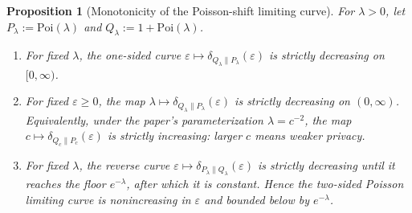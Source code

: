 \documentclass{article}
\newtheorem{proposition}[theorem]{Proposition}
\begin{document}
\begin{proposition}[Monotonicity of the Poisson-shift limiting curve]
\label{prop:poisson-monotonicity}
For $\lambda > 0$, let $P_\lambda := \mathrm{Poi}(\lambda)$ and $Q_\lambda := 1 + \mathrm{Poi}(\lambda)$.
\begin{enumerate}
\item[(i)] For fixed $\lambda$, the one-sided curve $\varepsilon \mapsto \delta_{Q_\lambda\|P_\lambda}(\varepsilon)$ is strictly decreasing on $[0, \infty)$.
\item[(ii)] For fixed $\varepsilon \geq 0$, the map $\lambda \mapsto \delta_{Q_\lambda\|P_\lambda}(\varepsilon)$ is strictly decreasing on $(0, \infty)$. Equivalently, under
the paper's parameterization $\lambda = c^{-2}$, the map $c \mapsto \delta_{Q_c\|P_c}(\varepsilon)$ is strictly increasing: larger $c$
means weaker privacy.
\item[(iii)] For fixed $\lambda$, the reverse curve $\varepsilon \mapsto \delta_{P_\lambda\|Q_\lambda}(\varepsilon)$ is strictly decreasing until it reaches the floor $e^{-\lambda}$,
after which it is constant. Hence the two-sided Poisson limiting curve is nonincreasing in $\varepsilon$
and bounded below by $e^{-\lambda}$.
\end{enumerate}
\end{proposition}
\end{document}
